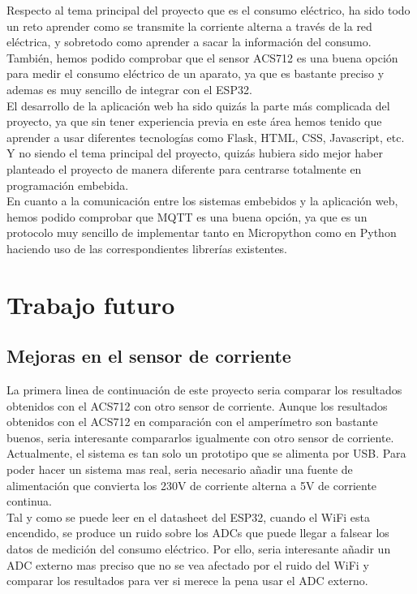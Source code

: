 \begin{titlepage}
Respecto al tema principal del proyecto que es el consumo eléctrico, ha sido todo un reto aprender como se transmite la corriente alterna a través de la red eléctrica, y sobretodo como aprender a sacar la información del consumo. También, hemos podido comprobar que el sensor ACS712 es una buena opción para medir el consumo eléctrico de un aparato, ya que es bastante preciso y ademas es muy sencillo de integrar con el ESP32.\\

El desarrollo de la aplicación web ha sido quizás la parte más complicada del proyecto, ya que sin tener experiencia previa en este área hemos tenido que aprender a usar diferentes tecnologías como Flask, HTML, CSS, Javascript, etc. Y no siendo el tema principal del proyecto, quizás hubiera sido mejor haber planteado el proyecto de manera diferente para centrarse totalmente en programación embebida. \\

En cuanto a la comunicación entre los sistemas embebidos y la aplicación web, hemos podido comprobar que MQTT es una buena opción, ya que es un protocolo muy sencillo de implementar tanto en Micropython como en Python haciendo uso de las correspondientes librerías existentes.\\



\section{Trabajo futuro}
\subsection{Mejoras en el sensor de corriente}
La primera linea de continuación de este proyecto seria comparar los resultados obtenidos con el ACS712 con otro sensor de corriente. Aunque los resultados obtenidos con el ACS712 en comparación con el amperímetro son bastante buenos, seria interesante compararlos igualmente con otro sensor de corriente.\\

Actualmente, el sistema es tan solo un prototipo que se alimenta por USB. Para poder hacer un sistema mas real, seria necesario añadir una fuente de alimentación\cite{ref24} que convierta los 230V de corriente alterna a 5V de corriente continua.\\

Tal y como se puede leer en el datasheet del ESP32, cuando el WiFi esta encendido, se produce un ruido sobre los ADCs que puede llegar a falsear los datos de medición del consumo eléctrico. Por ello, seria interesante añadir un ADC externo mas preciso que no se vea afectado por el ruido del WiFi y comparar los resultados para ver si merece la pena usar el ADC externo. \\


\end{titlepage}
